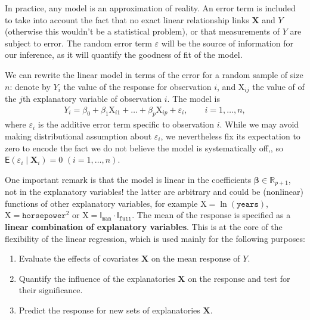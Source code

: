 \documentclass[
  11pt,
  letterpaper,
]{book}
\providecommand{\tightlist}{%
  \setlength{\itemsep}{0pt}\setlength{\parskip}{0pt}}
\theoremstyle{definition}
\theoremstyle{definition}
\theoremstyle{definition}
\theoremstyle{remark}
\begin{document}
In practice, any model is an approximation of reality. An error term is included to take into account the fact that no exact linear relationship links \(\mathbf{X}\) and \(Y\) (otherwise this wouldn't be a statistical problem), or that measurements of \(Y\) are subject to error. The random error term \(\varepsilon\) will be the source of information for our inference, as it will quantify the goodness of fit of the model.

We can rewrite the linear model in terms of the error for a random sample of size \(n\): denote by \(Y_i\) the value of the response for observation \(i\), and \(\mathrm{X}_{ij}\) the value of of the \(j\)th explanatory variable of observation \(i\). The model is
\begin{align}
Y_i = \beta_0 + \beta_1 \mathrm{X}_{i1} + \ldots + \beta_p \mathrm{X}_{ip} +\varepsilon_{i}, \qquad i =1, \ldots, n, \label{eq:olsmean}
\end{align}
where \(\varepsilon_i\) is the additive error term specific to observation \(i\). While we may avoid making distributional assumption about \(\varepsilon_i\), we nevertheless fix its expectation to zero to encode the fact we do not believe the model is systematically off,, so \(\mathsf{E}(\varepsilon_i \mid \boldsymbol{X}_i)=0\) \((i=1, \ldots, n)\).

One important remark is that the model is linear in the coefficients \(\boldsymbol{\beta}\in \mathbb{R}_{p+1}\), not in the explanatory variables! the latter are arbitrary and could be (nonlinear) functions of other explanatory variables, for example \(\mathrm{X}=\ln(\texttt{years})\), \(\mathrm{X}=\texttt{horsepower}^2\) or \(\mathrm{X}= \mathsf{I}_{\texttt{man}}\cdot\mathsf{I}_{\texttt{full}}\). The mean of the response is specified as a \textbf{linear combination of explanatory variables}. This is at the core of the flexibility of the linear regression, which is used mainly for the following purposes:

\begin{enumerate}
\def\labelenumi{\arabic{enumi}.}
\tightlist
\item
  Evaluate the effects of covariates \(\mathbf{X}\) on the mean response
  of \(Y\).
\item
  Quantify the influence of the explanatories \(\mathbf{X}\) on the
  response and test for their significance.
\item
  Predict the response for new sets of explanatories \(\mathbf{X}\).
\end{enumerate}
\end{document}
